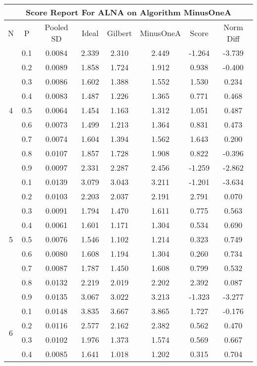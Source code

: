 \documentclass[11pt,a4paper]{report}
\begin{document}
\begin{longtable}{ | c | c || c | c | c | c | c | c | }
\hline
\multicolumn{8}{|c|}{ Score Report For ALNA on Algorithm MinusOneA} \\
\hline
N & P & Pooled SD &  Ideal &  Gilbert & MinusOneA  & Score & Norm Diff \\
 \hline
 \hline
 \endhead
\multirow{9}{*}{4} & 0.1 & 0.0084 & 2.339 & 2.310 & 2.449 & -1.264 & -3.739 \\
 & 0.2 & 0.0089 & 1.858 & 1.724 & 1.912 & 0.938 & -0.400 \\
 & 0.3 & 0.0086 & 1.602 & 1.388 & 1.552 & 1.530 & 0.234 \\
 & 0.4 & 0.0083 & 1.487 & 1.226 & 1.365 & 0.771 & 0.468 \\
 & 0.5 & 0.0064 & 1.454 & 1.163 & 1.312 & 1.051 & 0.487 \\
 & 0.6 & 0.0073 & 1.499 & 1.213 & 1.364 & 0.831 & 0.473 \\
 & 0.7 & 0.0074 & 1.604 & 1.394 & 1.562 & 1.643 & 0.200 \\
 & 0.8 & 0.0107 & 1.857 & 1.728 & 1.908 & 0.822 & -0.396 \\
 & 0.9 & 0.0097 & 2.331 & 2.287 & 2.456 & -1.259 & -2.862 \\
 \hline
\multirow{9}{*}{5} & 0.1 & 0.0139 & 3.079 & 3.043 & 3.211 & -1.201 & -3.634 \\
 & 0.2 & 0.0103 & 2.203 & 2.037 & 2.191 & 2.791 & 0.070 \\
 & 0.3 & 0.0091 & 1.794 & 1.470 & 1.611 & 0.775 & 0.563 \\
 & 0.4 & 0.0061 & 1.601 & 1.171 & 1.304 & 0.534 & 0.690 \\
 & 0.5 & 0.0076 & 1.546 & 1.102 & 1.214 & 0.323 & 0.749 \\
 & 0.6 & 0.0080 & 1.608 & 1.194 & 1.304 & 0.260 & 0.734 \\
 & 0.7 & 0.0087 & 1.787 & 1.450 & 1.608 & 0.799 & 0.532 \\
 & 0.8 & 0.0132 & 2.219 & 2.019 & 2.202 & 2.392 & 0.087 \\
 & 0.9 & 0.0135 & 3.067 & 3.022 & 3.213 & -1.323 & -3.277 \\
 \hline
\multirow{9}{*}{6} & 0.1 & 0.0148 & 3.835 & 3.667 & 3.865 & 1.727 & -0.176 \\
 & 0.2 & 0.0116 & 2.577 & 2.162 & 2.382 & 0.562 & 0.470 \\
 & 0.3 & 0.0102 & 1.976 & 1.373 & 1.574 & 0.569 & 0.667 \\
 & 0.4 & 0.0085 & 1.641 & 1.018 & 1.202 & 0.315 & 0.704 \\

\end{longtable}
\end{document}
